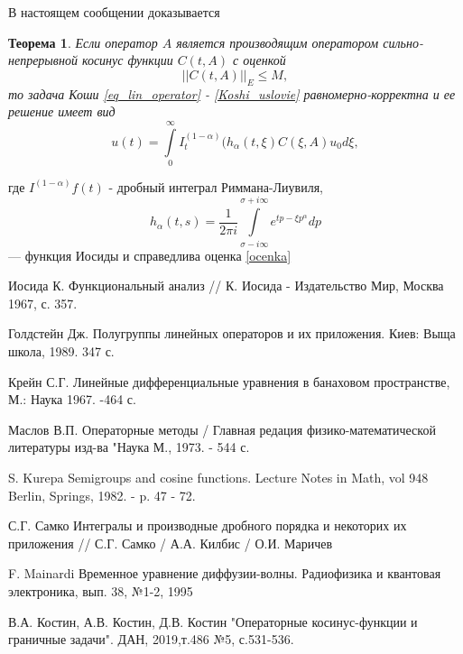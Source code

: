\documentclass[12pt,openbib]{article}
\newtheorem{Theorem}{Теорема}
\begin{document}
В настоящем сообщении доказывается
	\begin{Theorem}
		Если оператор $A$ является производящим оператором сильно-непрерывной косинус функции $C(t,A)$ с оценкой
		\begin{equation}
			||C(t,A)||_E \leq M,
		\end{equation}
		то задача Коши \ref{eq_lin_operator} - \ref{Koshi_uslovie} равномерно-корректна и ее решение имеет вид
		\begin{equation}
			u(t) = \int\limits^{\infty}_0 I^{(1-\alpha)}_t (h_{\alpha}(t, \xi) C(\xi, A)u_0 d\xi,
		\end{equation}
	\end{Theorem}
	где $I^{(1-\alpha)}f(t)$ - дробный интеграл Риммана-Лиувиля,
	$$
		h_\alpha(t,s) = \frac{1}{2\pi i} \int\limits^{\sigma + i\infty}_{\sigma - i \infty} e^{tp-\xi p^{\alpha}} dp
	$$ --- функция Иосиды
	и справедлива оценка \ref{ocenka}
	
	\newpage

\begin{thebibliography}{99}

    Иосида К. Функциональный анализ // К. Иосида - Издательство Мир, Москва 1967, с. 357.

    Голдстейн Дж. Полугруппы линейных операторов и их приложения. Киев: Выща школа, 1989. 347 с.

    Крейн С.Г. Линейные дифференциальные уравнения в банаховом пространстве, М.: Наука 1967. -464 с.

    Маслов В.П. Операторные методы / Главная редация физико-математической литературы изд-ва "Наука М., 1973. - 544 с.

    S. Kurepa Semigroups  and cosine functions. Lecture Notes in Math, vol 948 Berlin, Springs, 1982. - p. 47 - 72.

    С.Г. Самко Интегралы и производные дробного порядка и некоторих их приложения // С.Г. Самко / А.А. Килбис / О.И. Маричев

    F. Mainardi Временное уравнение диффузии-волны. Радиофизика и квантовая электроника, вып. 38, №1-2, 1995

    В.А. Костин, А.В. Костин, Д.В. Костин "Операторные косинус-функции и граничные задачи". ДАН, 2019,т.486 №5, с.531-536.

\end{thebibliography}
	
\end{document}
